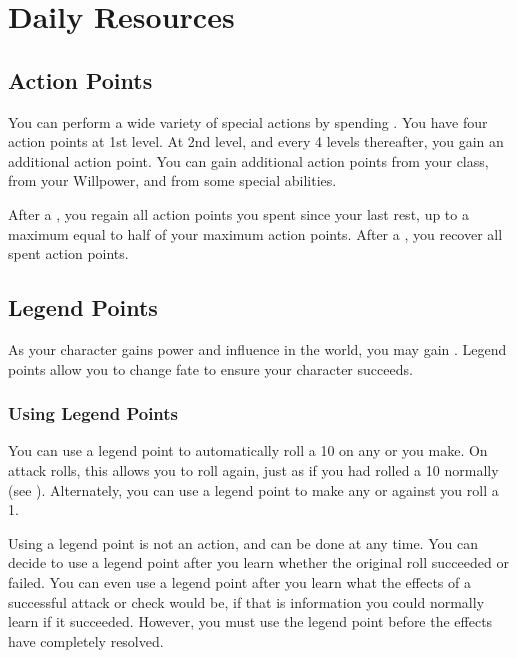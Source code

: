 \section{Daily Resources}

    \subsection{Action Points}\label{Action Points}
        You can perform a wide variety of special actions by spending .
        You have four action points at 1st level.
        At 2nd level, and every 4 levels thereafter, you gain an additional action point.
        You can gain additional action points from your class, from your Willpower, and from some special abilities.

        After a , you regain all action points you spent since your last rest, up to a maximum equal to half of your maximum action points.
        After a , you recover all spent action points.

    \subsection{Legend Points}\label{Legend Points}

        As your character gains power and influence in the world, you may gain .
        Legend points allow you to change fate to ensure your character succeeds.

        \subsubsection{Using Legend Points}
            You can use a legend point to automatically roll a 10 on any  or  you make.
            On attack rolls, this allows you to roll again, just as if you had rolled a 10 normally (see ).
            Alternately, you can use a legend point to make any  or  against you roll a 1.

            Using a legend point is not an action, and can be done at any time.
            You can decide to use a legend point after you learn whether the original roll succeeded or failed.
            You can even use a legend point after you learn what the effects of a successful attack or check would be, if that is information you could normally learn if it succeeded.
            However, you must use the legend point before the effects have completely resolved.

